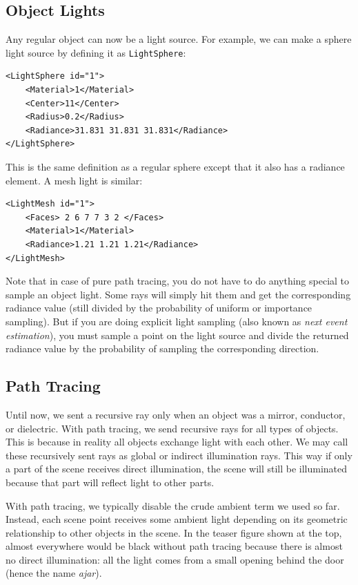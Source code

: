 \documentclass[12pt]{article}
\begin{document}
\subsection{Object Lights}

Any regular object can now be a light source. For example, we can make a
sphere light source by defining it as \texttt{LightSphere}:
%
\begin{verbatim}
<LightSphere id="1">
    <Material>1</Material>
    <Center>11</Center>
    <Radius>0.2</Radius>
    <Radiance>31.831 31.831 31.831</Radiance>
</LightSphere>
\end{verbatim}
%
This is the same definition as a regular sphere except that it also has
a radiance element. A mesh light is similar:
%
\begin{verbatim}
<LightMesh id="1">
    <Faces> 2 6 7 7 3 2 </Faces>
    <Material>1</Material>
    <Radiance>1.21 1.21 1.21</Radiance>
</LightMesh>
\end{verbatim}
%
Note that in case of pure path tracing, you do not have to do anything
special to sample an object light. Some rays will simply hit them and
get the corresponding radiance value (still divided by the probability
of uniform or importance sampling). But if you are doing explicit
light sampling (also known as \emph{next event estimation}), you must
sample a point on the light source and divide the returned radiance
value by the probability of sampling the corresponding direction. 

\subsection{Path Tracing}

Until now, we sent a recursive ray only when an object was a mirror,
conductor, or dielectric. With path tracing, we send recursive
rays for all types of objects. This is because in reality all
objects exchange light with each other. We may call these
recursively sent rays as global or indirect illumination rays.
This way if only a part of the scene receives direct illumination,
the scene will still be illuminated because that part will reflect
light to other parts. 

With path tracing, we typically disable the
crude ambient term we used so far. Instead, each scene point
receives some ambient light depending on its geometric
relationship to other objects in the scene. In the teaser figure
shown at the top, almost everywhere would be black without path
tracing because there is almost no direct illumination: all the
light comes from a small opening behind the door (hence the name
\emph{ajar}).
\end{document}
